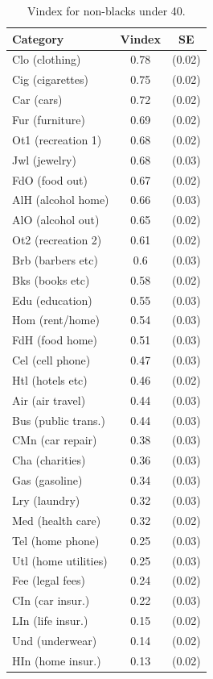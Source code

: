 \documentclass[12pt]{article}
\begin{document}
\begin{table}
	\begin{center}
\begin{tabular}{|l|c|c|}
	\hline
	\textbf{Category} & \textbf{Vindex} & \textbf{SE} \\
	\hline
Clo (clothing) & 0.78 & (0.02)\\ 
	\hline
Cig (cigarettes) & 0.75 & (0.02)\\ 
	\hline
Car (cars) & 0.72 & (0.02)\\ 
	\hline
Fur (furniture) & 0.69 & (0.02)\\ 
	\hline
Ot1 (recreation 1) & 0.68 & (0.02)\\ 
	\hline
Jwl (jewelry) & 0.68 & (0.03)\\ 
	\hline
FdO (food out) & 0.67 & (0.02)\\ 
	\hline
AlH (alcohol home) & 0.66 & (0.03)\\ 
	\hline
AlO (alcohol out) & 0.65 & (0.02)\\ 
	\hline
Ot2 (recreation 2) & 0.61 & (0.02)\\ 
	\hline
Brb (barbers etc) & 0.6 & (0.03)\\ 
	\hline
Bks (books etc) & 0.58 & (0.02)\\ 
	\hline
Edu (education) & 0.55 & (0.03)\\ 
	\hline
Hom (rent/home) & 0.54 & (0.03)\\ 
	\hline
FdH (food home) & 0.51 & (0.03)\\ 
	\hline
Cel (cell phone) & 0.47 & (0.03)\\ 
	\hline
Htl (hotels etc) & 0.46 & (0.02)\\ 
	\hline
Air (air travel) & 0.44 & (0.03)\\ 
	\hline
Bus (public trans.) & 0.44 & (0.03)\\ 
	\hline
CMn (car repair) & 0.38 & (0.03)\\ 
	\hline
Cha (charities) & 0.36 & (0.03)\\ 
	\hline
Gas (gasoline) & 0.34 & (0.03)\\ 
	\hline
Lry (laundry) & 0.32 & (0.03)\\ 
	\hline
Med (health care) & 0.32 & (0.02)\\ 
	\hline
Tel (home phone) & 0.25 & (0.03)\\ 
	\hline
Utl (home utilities) & 0.25 & (0.03)\\ 
	\hline
Fee (legal fees) & 0.24 & (0.02)\\ 
	\hline
CIn (car insur.) & 0.22 & (0.03)\\ 
	\hline
LIn (life insur.) & 0.15 & (0.02)\\ 
	\hline
Und (underwear) & 0.14 & (0.02)\\ 
	\hline
HIn (home insur.) & 0.13 & (0.02)\\ 
	\hline
\end{tabular}
\end{center}
\label{tab:vintab}
\caption{Vindex for non-blacks under 40.}
\vspace{-2in}
\end{table}
\end{document}

